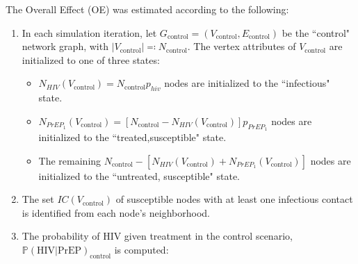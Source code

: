 \documentclass{article}
\theoremstyle{definition}
\begin{document}
The Overall Effect (OE) was estimated according to the following:
    \begin{enumerate}
\item In each simulation iteration, let $G_{\text{control}}=\left(V_{\text{control}},E_{\text{control}}\right)$ be the ``control" network graph, with $\vert V_{\text{control}}\vert \eqqcolon N_{\text{control}}$. The vertex attributes of $V_{\text{control}}$ are initialized to one of three states: 
\begin{itemize}
        \item  $N_{HIV}(V_{\text{control}})=N_{\text{control}}p_{hiv}$ nodes are initialized to the  ``infectious" state.
        \item $N_{PrEP_{1}}\left(V_{\text{control}}\right)=\left[N_{\text{control}}-N_{HIV}\left(V_{\text{control}}\right)\right]p_{PrEP_{1}}$ nodes are initialized to the ``treated,susceptible" state. 
        \item The remaining $N_{\text{control}}-\left[N_{HIV}\left(V_{\text{control}}\right)+N_{PrEP_{1}}\left(V_{\text{control}}\right)\right]$ nodes are initialized to the ``untreated, susceptible" state.
    \end{itemize}
    \item The set $IC(V_{\text{control}})$ of susceptible nodes with at least one infectious contact is identified from each node's neighborhood.
    \item The probability of HIV given treatment in the control scenario, $\mathbb{P}(\text{HIV} \vert \text{PrEP})_{\text{control}}$ is computed:
    \begin{enumerate}
     

\end{enumerate}
\end{enumerate}
\end{document}
